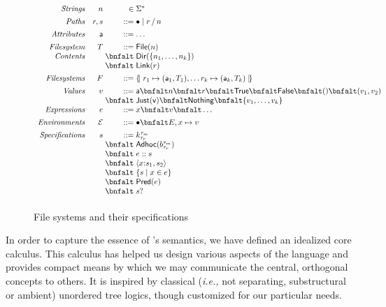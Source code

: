 \begin{figure}
\[
\begin{array}{rr@{\;}r@{\;}l}
\textit{Strings}        & n & \in & \Sigma^{\ast} \\[1ex]
\textit{Paths}          & r,s & \bnfdef & \PNil \mid \PCons{r}{n} \\[1ex]
\textit{Attributes}     & \att  & \bnfdef & \dots\\[1ex]
\textit{Filesystem}     & T  & \bnfdef & \File{n} \\
\textit{Contents}       &    & \bnfalt & \Dir{ \Set{n_1,\dots,n_k} }\\
                        &    & \bnfalt & \Link{r}\\[1ex]
\textit{Filesystems}    & F & \bnfdef & \Map{ r_1 \mapsto (\att_1,T_1), \dots r_k \mapsto (\att_k,T_k) }\\[1ex]
\textit{Values}         & v & \bnfdef & \att \bnfalt n \bnfalt r \bnfalt \True \bnfalt \False \bnfalt () \bnfalt (v_1,v_2) \\
                        &   & \bnfalt & \Just{v} \bnfalt \Nothing \bnfalt \{ v_1,\dots,v_k \}\\
\textit{Expressions}    & e & \bnfdef & x \bnfalt v \bnfalt \dots \\[1ex]
\textit{Environments}   & \Env & \bnfdef & \ENil \bnfalt E,x\mapsto v \\[1ex]
\textit{Specifications} & s & \bnfdef & \Sk \\
                        &   & \bnfalt & \SAdhoc{b}\\
                        &   & \bnfalt & \SPath{e}{s}\\
                        &   & \bnfalt & \SPair{x}{s_1}{s_2}\\
                        &   & \bnfalt & \SSetComp{s}{x}{e}\\
                        &   & \bnfalt & \SPred{e}\\
                        &   & \bnfalt & \SOption{s}\\[1ex]
\end{array}
\]
\caption{File systems and their specifications}
\label{fig:calculus-syntax}
\end{figure}

In order to capture the essence of \forest{}'s semantics, we have
defined an idealized core calculus.  This calculus has helped us
design various aspects of the \forest{} language and provides
compact means by which we may communicate the central, orthogonal
concepts to others.  It is inspired by classical ({\em i.e.,} not
separating, substructural or ambient) unordered tree logics, though
customized for our particular needs.

